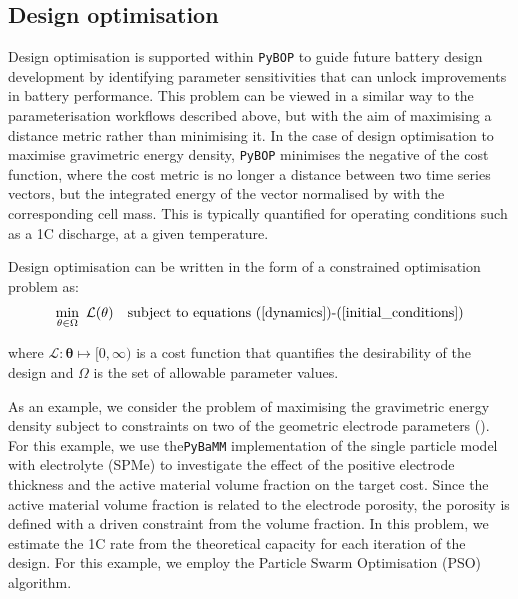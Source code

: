 \documentclass[
]{article}
\begin{document}
\subsection{Design optimisation}\label{design-optimisation}

Design optimisation is supported within \texttt{PyBOP} to guide future
battery design development by identifying parameter sensitivities that
can unlock improvements in battery performance. This problem can be
viewed in a similar way to the parameterisation workflows described
above, but with the aim of maximising a distance metric rather than
minimising it. In the case of design optimisation to maximise
gravimetric energy density, \texttt{PyBOP} minimises the negative of the
cost function, where the cost metric is no longer a distance between two
time series vectors, but the integrated energy of the vector normalised
by with the corresponding cell mass. This is typically quantified for
operating conditions such as a 1C discharge, at a given temperature.

Design optimisation can be written in the form of a constrained
optimisation problem as: \begin{equation}
\min_{\mathbf{\theta} \in \Omega} ~ \mathcal{L}(\mathbf{\theta}) ~~~
\textrm{subject to equations (\ref{dynamics})\textrm{-}(\ref{initial_conditions})}
\label{eqn:design}
\end{equation}

where \(\mathcal{L} : \mathbf{\theta} \mapsto [0,\infty)\) is a cost
function that quantifies the desirability of the design and \(\Omega\)
is the set of allowable parameter values.

As an example, we consider the problem of maximising the gravimetric
energy density subject to constraints on two of the geometric electrode
parameters (). For this
example, we use the\texttt{PyBaMM} implementation of the single particle
model with electrolyte (SPMe) to investigate the effect of the positive
electrode thickness and the active material volume fraction on the
target cost. Since the active material volume fraction is related to the
electrode porosity, the porosity is defined with a driven constraint
from the volume fraction. In this problem, we estimate the 1C rate from
the theoretical capacity for each iteration of the design. For this
example, we employ the Particle Swarm Optimisation (PSO) algorithm.
\end{document}
